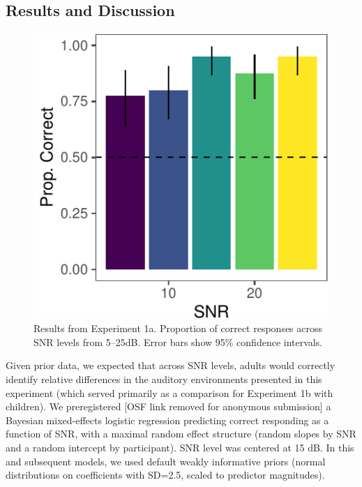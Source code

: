 \documentclass[10pt, letterpaper]{article}
\newenvironment{CodeChunk}{}{}
\begin{document}
\hypertarget{results-and-discussion}{%
\subsection{Results and Discussion}\label{results-and-discussion}}

\begin{CodeChunk}
\begin{figure}[t]

{\centering \includegraphics{figs/e1a-bar-1} 

}

\caption[Results from Experiment 1a]{Results from Experiment 1a. Proportion of correct responses across SNR levels from 5--25dB. Error bars show 95\% confidence intervals.}\label{fig:e1a-bar}
\end{figure}
\end{CodeChunk}

Given prior data, we expected that across SNR levels, adults would
correctly identify relative differences in the auditory environments
presented in this experiment (which served primarily as a comparison for
Experiment 1b with children). We preregistered {[}OSF link removed for
anonymous submission{]} a Bayesian mixed-effects logistic regression
predicting correct responding as a function of SNR, with a maximal
random effect structure (random slopes by SNR and a random intercept by
participant). SNR level was centered at 15 dB. In this and subsequent
models, we used default weakly informative priors (normal distributions
on coefficients with SD=2.5, scaled to predictor magnitudes).
\end{document}
